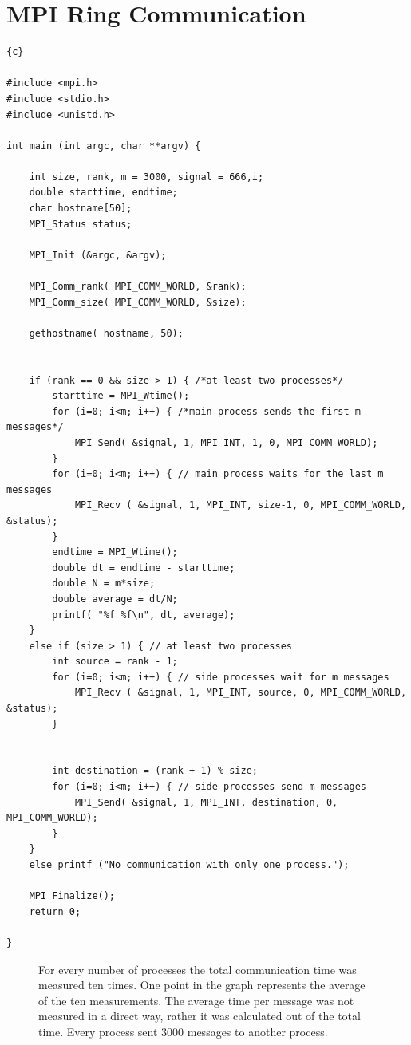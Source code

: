 \documentclass{article}
\newcommand{\enterProblemHeader}[1]{
}
\newcommand{\exitProblemHeader}[1]{
}
\newcounter{homeworkProblemCounter} %
\newcommand{\homeworkProblemName}{}
\newenvironment{homeworkProblem}[1][Problem \arabic{homeworkProblemCounter}]{ %
\stepcounter{homeworkProblemCounter} %
\renewcommand{\homeworkProblemName}{#1} %
\section{\homeworkProblemName} %
}{
}
\begin{document}
\begin{homeworkProblem}[MPI Ring Communication]

\begin{lstlisting}{c}

#include <mpi.h>
#include <stdio.h>
#include <unistd.h>

int main (int argc, char **argv) {

    int size, rank, m = 3000, signal = 666,i;
    double starttime, endtime;
    char hostname[50];
    MPI_Status status;

    MPI_Init (&argc, &argv);

    MPI_Comm_rank( MPI_COMM_WORLD, &rank);
    MPI_Comm_size( MPI_COMM_WORLD, &size);

    gethostname( hostname, 50);


    if (rank == 0 && size > 1) { /*at least two processes*/
        starttime = MPI_Wtime();
        for (i=0; i<m; i++) { /*main process sends the first m messages*/
            MPI_Send( &signal, 1, MPI_INT, 1, 0, MPI_COMM_WORLD); 
        }
        for (i=0; i<m; i++) { // main process waits for the last m messages
            MPI_Recv ( &signal, 1, MPI_INT, size-1, 0, MPI_COMM_WORLD, &status);
        }
        endtime = MPI_Wtime();
        double dt = endtime - starttime;
        double N = m*size;
        double average = dt/N;
        printf( "%f %f\n", dt, average);
    }
    else if (size > 1) { // at least two processes
        int source = rank - 1;
        for (i=0; i<m; i++) { // side processes wait for m messages
            MPI_Recv ( &signal, 1, MPI_INT, source, 0, MPI_COMM_WORLD, &status);
        }
   

        int destination = (rank + 1) % size;
        for (i=0; i<m; i++) { // side processes send m messages
            MPI_Send( &signal, 1, MPI_INT, destination, 0, MPI_COMM_WORLD);
        }
    }
    else printf ("No communication with only one process.");

    MPI_Finalize();
    return 0;

}\end{lstlisting}

\begin{figure}
    \begin{center}
        
    \end{center}
    \caption{For every number of processes the total communication time was measured ten times.
        One point in the graph represents the average of the ten measurements. The average
        time per message was not measured in a direct way, rather it was calculated
        out of the total time. Every process sent 3000 messages to another process.}
\end{figure}    

\end{homeworkProblem}
\end{document}
